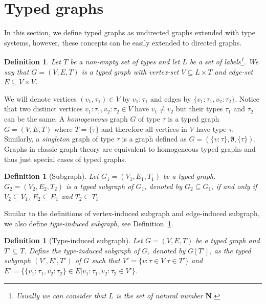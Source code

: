 \documentclass[preprint,12pt]{elsarticle}
\theoremstyle{plain}
\newtheorem{definition}[theorem]{Definition}
\newcommand\tyv[2]{#1\!\!:\!\!#2}
\newcommand\subgraph{\subseteq}
\begin{document}
\section{Typed graphs}

In this section, we define typed graphs as undirected graphs extended with type systems,
however, these concepts can be easily extended to directed graphs.

\begin{definition}
Let $T$ be a non-empty set of types
and let $L$ be a set of labels\footnote{Usually we can consider that $L$ is the set of
natural number $\mathbf{N}$.}.
We say that $G = (V,E,T)$ is a typed graph %
with vertex-set $V \subseteq L\times T$ and edge-set $E \subseteq V\times V$.
\end{definition}

We will denote vertices $(v_1, \tau_1) \in V$ by $\tyv{v_1}{\tau_1}$ and edges by $\{\tyv{v_1}{\tau_1}, \tyv{v_2}{\tau_2}\}$.
Notice that two distinct vertices $\tyv{v_1}{\tau_1}, \tyv{v_2}{\tau_2} \in V$ have $v_1 \neq v_2$ but their types $\tau_1$ and $\tau_2$ can be the same.
A \textit{homogeneous} graph $G$ of type $\tau$ is a typed graph $G = (V,E,T)$ where $T = \{\tau\}$ and therefore all vertices in $V$ have type $\tau$.
Similarly, a \textit{singleton} graph of type $\tau$ is a graph defined as $G = (\{\tyv{v}{\tau}\}, \emptyset, \{\tau\})$.
Graphs in classic graph theory are equivalent to homogeneous typed graphs and thus just special cases of typed graphs.

\begin{definition}[Subgraph]
Let $G_1 = (V_1,E_1,T_1)$ be a typed graph.
$G_2 = (V_2,E_2,T_2)$ is a typed subgraph of $G_1$,
denoted by $G_2 \subgraph G_1$,
if and only if $V_2 \subseteq V_1$,
$E_2 \subseteq E_1$ and $T_2 \subseteq T_1$.
\end{definition}

Similar to the definitions of vertex-induced subgraph and 
edge-induced subgraph, we also define \textit{type-induced subgraph},
see Definition~\ref{def:typeindsubgraph}.

\begin{definition}[Type-induced subgraph]\label{def:typeindsubgraph}
Let $G = (V,E,T)$ be a typed graph
and $T'\subseteq T$.
Define the type-induced subgraph of $G$,
denoted by $G[T']$, as the typed subgraph $(V',E',T')$
of $G$ such that
$V' = \{ \tyv{v}{\tau}\in V| \tau\in T'\}$
and
$E' = \{\{\tyv{v_1}{\tau_1}, \tyv{v_2}{\tau_2}\}\in E| \tyv{v_1}{\tau_1}, \tyv{v_2}{\tau_2}\in V'\}$.
\end{definition}
\end{document}
